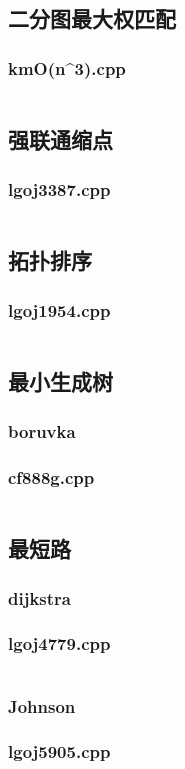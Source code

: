 \documentclass[a4paper,landscape,twocolumn]{article} %
\begin{document}
\subsection{二分图最大权匹配}
\subsubsection{kmO(n^3).cpp}
\inputminted{c++}{./codes/006}
\subsection{强联通缩点}
\subsubsection{lgoj3387.cpp}
\inputminted{c++}{./codes/007}
\subsection{拓扑排序}
\subsubsection{lgoj1954.cpp}
\inputminted{c++}{./codes/008}
\subsection{最小生成树}
\subsubsection{boruvka}
\subsubsection{cf888g.cpp}
\inputminted{c++}{./codes/009}
\subsection{最短路}
\subsubsection{dijkstra}
\subsubsection{lgoj4779.cpp}
\inputminted{c++}{./codes/010}
\subsubsection{Johnson}
\subsubsection{lgoj5905.cpp}
\inputminted{c++}{./codes/011}
\end{document}
